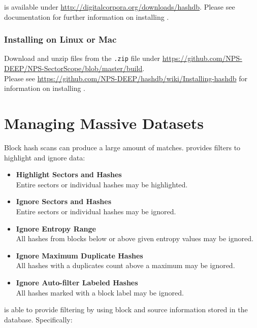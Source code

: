 \documentclass[11pt,fleqn]{article} %
\begin{document}
\hdb is available under \url{http://digitalcorpora.org/downloads/hashdb}. Please see \hdb documentation for further information on installing \hdb.\\

\subsubsection{Installing on Linux or Mac}
Download and unzip \sscope files from the \verb+.zip+ file under \url{https://github.com/NPS-DEEP/NPS-SectorScope/blob/master/build}.\\ Please see \url{https://github.com/NPS-DEEP/hashdb/wiki/Installing-hashdb} for information on installing \hdb.\\

\section{Managing Massive Datasets}
Block hash scans can produce a large amount of matches. \sscope provides filters to highlight and ignore data:
\begin{itemize}
\item \textbf{Highlight Sectors and Hashes}\\
Entire sectors or individual hashes may be highlighted.
\item \textbf{Ignore Sectors and Hashes}\\
Entire sectors or individual hashes may be ignored.
\item \textbf{Ignore Entropy Range}\\
All hashes from blocks below or above given entropy values may be ignored.
\item \textbf{Ignore Maximum Duplicate Hashes}\\
All hashes with a duplicates count above a maximum may be ignored.
\item \textbf{Ignore Auto-filter Labeled Hashes}\\
All hashes marked with a block label may be ignored.
\end{itemize}
\sscope is able to provide filtering by using block and source information stored in the \hdb database. Specifically:
\end{document}

